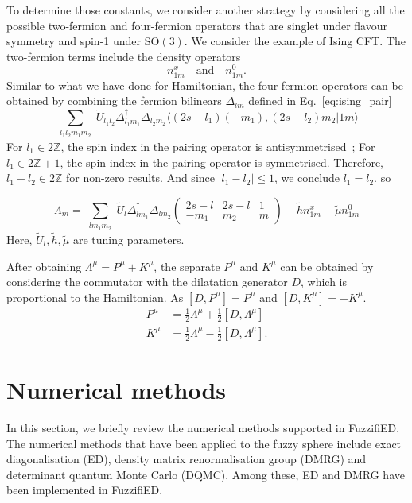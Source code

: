 \documentclass{timesjhep}
\begin{document}
To determine those constants, we consider another strategy by considering all the possible two-fermion and four-fermion operators that are singlet under flavour symmetry and spin-1 under $\mathrm{SO}(3)$. We consider the example of Ising CFT. The two-fermion terms include the density operators
\begin{equation*}
    n^x_{1m}\quad\textrm{and}\quad n^0_{1m}.
\end{equation*}
Similar to what we have done for Hamiltonian, the four-fermion operators can be obtained by combining the fermion bilinears $\Delta_{lm}$ defined in Eq.~\eqref{eq:ising_pair}
\begin{equation}
    \sum_{\substack{l_1l_2m_1m_2}}\tilde{U}_{l_1l_2}\Delta^\dagger_{l_1m_1}\Delta_{l_2m_2}\langle (2s-l_1)(-m_1),(2s-l_2)m_2|1m\rangle
\end{equation}
For $l_1\in2\mathbb{Z}$, the spin index in the pairing operator is antisymmetrised~; For $l_1\in2\mathbb{Z}+1$, the spin index in the pairing operator is symmetrised. Therefore, $l_1-l_2\in2\mathbb{Z}$ for non-zero results. And since $|l_1-l_2|\leq 1$, we conclude $l_1=l_2$. so

\begin{equation}
    \Lambda_m=\sum_{\substack{lm_1m_2}}\tilde{U}_{l}\Delta^\dagger_{lm_1}\Delta_{lm_2}\begin{pmatrix}2s-l&2s-l&1\\-m_1&m_2&m     \end{pmatrix}+\tilde{h}n^x_{1m}+\tilde{\mu}n^0_{1m}
\end{equation}
Here, $\tilde{U}_l,\tilde{h},\tilde{\mu}$ are tuning parameters.

After obtaining $\Lambda^\mu=P^\mu+K^\mu$, the separate $P^\mu$ and $K^\mu$ can be obtained by considering the commutator with the dilatation generator $D$, which is proportional to the Hamiltonian. As $[D,P^\mu]=P^\mu$ and $[D,K^\mu]=-K^\mu$.
\begin{align}
    P^\mu&=\tfrac{1}{2}\Lambda^\mu+\tfrac{1}{2}[D,\Lambda^\mu]\nonumber\\
    K^\mu&=\tfrac{1}{2}\Lambda^\mu-\tfrac{1}{2}[D,\Lambda^\mu].
\end{align}

\section{Numerical methods}
\label{sec:numerics}

In this section, we briefly review the numerical methods supported in FuzzifiED. The numerical methods that have been applied to the fuzzy sphere include exact diagonalisation (ED), density matrix renormalisation group (DMRG) and determinant quantum Monte Carlo (DQMC). Among these, ED and DMRG have been implemented in FuzzifiED.
\end{document}

